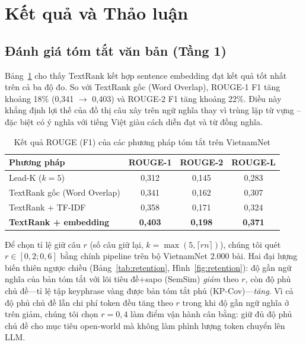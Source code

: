 \section{Kết quả và Thảo luận}

\subsection{Đánh giá tóm tắt văn bản (Tầng 1)}
Bảng~\ref{tab:rouge} cho thấy TextRank kết hợp sentence embedding đạt kết quả tốt
nhất trên cả ba độ đo. So với TextRank gốc (Word Overlap), ROUGE-1 F1 tăng khoảng
18\% (0,341 $\rightarrow$ 0,403) và ROUGE-2 F1 tăng khoảng 22\%. Điều này khẳng
định lợi thế của đồ thị câu xây trên ngữ nghĩa thay vì trùng lặp từ vựng -- đặc
biệt có ý nghĩa với tiếng Việt giàu cách diễn đạt và từ đồng nghĩa.

\begin{table}[!t]
\renewcommand{\arraystretch}{1.2}
\caption{Kết quả ROUGE (F1) của các phương pháp tóm tắt trên VietnamNet}
\label{tab:rouge}
\centering
\footnotesize
\begin{tabularx}{\columnwidth}{@{}Xccc@{}}
\toprule
\textbf{Phương pháp} & \textbf{ROUGE-1} & \textbf{ROUGE-2} & \textbf{ROUGE-L} \\
\midrule
Lead-K ($k=5$)                  & 0,312 & 0,145 & 0,283 \\
TextRank gốc (Word Overlap)     & 0,341 & 0,162 & 0,307 \\
TextRank + TF-IDF               & 0,358 & 0,171 & 0,324 \\
\textbf{TextRank + embedding}   & \textbf{0,403} & \textbf{0,198} & \textbf{0,371} \\
\bottomrule
\end{tabularx}
\end{table}

Để chọn tỉ lệ giữ câu $r$ (số câu giữ lại, $k=\max(5,\lceil r n\rceil)$), chúng tôi quét
$r\in[0{,}2;0{,}6]$ bằng chính pipeline trên bộ VietnamNet $2{.}000$ bài. Hai đại lượng biến thiên ngược chiều
(Bảng~\ref{tab:retention}, Hình~\ref{fig:retention}): độ gần ngữ nghĩa của bản tóm tắt với lõi
tiêu đề+sapo (SemSim) \emph{giảm} theo $r$, còn độ phủ chủ đề---tỉ lệ tập keyphrase vàng được
bản tóm tắt phủ (KP-Cov)---\emph{tăng}. Vì cả độ phủ chủ đề lẫn chi phí token đều tăng theo $r$ trong khi độ gần
ngữ nghĩa ở trên giảm, chúng tôi chọn $r=0{,}4$ làm điểm vận hành cân bằng:
giữ đủ độ phủ chủ đề cho mục tiêu open-world mà không làm phình lượng token chuyển lên LLM.

